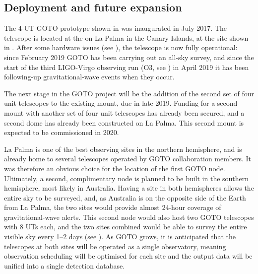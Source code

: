 
\subsection{Deployment and future expansion}
\label{sec:goto_expansion}
\begin{colsection}

The 4-UT GOTO prototype shown in  was inaugurated in July 2017. The telescope is located at the  on La Palma in the Canary Islands, at the site shown in . After some hardware issues (see ), the telescope is now fully operational: since February 2019 GOTO has been carrying out an all-sky survey, and since the start of the third LIGO-Virgo observing run (O3, see ) in April 2019 it has been following-up gravitational-wave events when they occur.

The next stage in the GOTO project will be the addition of the second set of four unit telescopes to the existing mount, due in late 2019. Funding for a second mount with another set of four unit telescopes has already been secured, and a second dome has already been constructed on La Palma. This second mount is expected to be commissioned in 2020.

La Palma is one of the best observing sites in the northern hemisphere, and is already home to several telescopes operated by GOTO collaboration members. It was therefore an obvious choice for the location of the first GOTO node. Ultimately, a second, complimentary node is planned to be built in the southern hemisphere, most likely in Australia. Having a site in both hemispheres allows the entire sky to be surveyed, and, as Australia is on the opposite side of the Earth from La Palma, the two sites would provide almost 24-hour coverage of gravitational-wave alerts. This second node would also host two GOTO telescopes with 8 UTs each, and the two sites combined would be able to survey the entire visible sky every 1--2 days (see ). As GOTO grows, it is anticipated that the telescopes at both sites will be operated as a single observatory, meaning observation scheduling will be optimised for each site and the output data will be unified into a single detection database.


\end{colsection}
